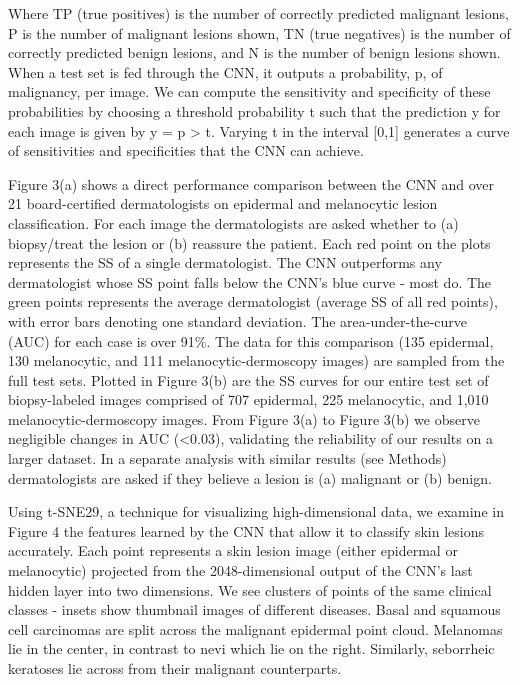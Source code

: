 Where TP (true positives) is the number of correctly predicted malignant lesions, P is the number of malignant lesions shown, TN (true negatives) is the number of correctly predicted benign lesions, and N is the number of benign lesions shown. When a test set is fed through the CNN, it outputs a probability, p, of malignancy, per image. We can compute the sensitivity and specificity of these probabilities by choosing a threshold probability t such that the prediction y for each image is given by y = p > t. Varying t in the interval [0,1] generates a curve of sensitivities and specificities that the CNN can achieve.

Figure 3(a) shows a direct performance comparison between the CNN and over 21 board-certified dermatologists on epidermal and melanocytic lesion classification. For each image the dermatologists are asked whether to (a) biopsy/treat the lesion or (b) reassure the patient. Each red point on the plots represents the SS of a single dermatologist. The CNN outperforms any dermatologist whose SS point falls below the CNN’s blue curve - most do. The green points represents the average dermatologist (average SS of all red points), with error bars denoting one standard deviation. The area-under-the-curve (AUC) for each case is over 91\%. The data for this comparison (135 epidermal, 130 melanocytic, and 111 melanocytic-dermoscopy images) are sampled from the full test sets. Plotted in Figure 3(b) are the SS curves for our entire test set of biopsy-labeled images comprised of 707 epidermal, 225 melanocytic, and 1,010 melanocytic-dermoscopy images. From Figure 3(a) to Figure 3(b) we observe negligible changes in AUC (<0.03), validating the reliability of our results on a larger dataset. In a separate analysis with similar results (see Methods) dermatologists are asked if they believe a lesion is (a) malignant or (b) benign.

Using t-SNE29, a technique for visualizing high-dimensional data, we examine in Figure 4 the features learned by the CNN that allow it to classify skin lesions accurately. Each point represents a skin lesion image (either epidermal or melanocytic) projected from the 2048-dimensional output of the CNN’s last hidden layer into two dimensions.   We see clusters of points of the same clinical classes - insets show thumbnail images of different diseases. Basal and squamous cell carcinomas are split across the malignant epidermal point cloud. Melanomas lie in the center, in contrast to nevi which lie on the right. Similarly, seborrheic keratoses lie across from their malignant counterparts. 

